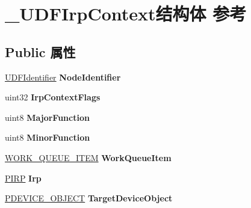 \hypertarget{struct___u_d_f_irp_context}{}\section{\+\_\+\+U\+D\+F\+Irp\+Context结构体 参考}
\label{struct___u_d_f_irp_context}
\subsection*{Public 属性}
\begin{DoxyCompactItemize}
\item 
\mbox{\label{struct___u_d_f_irp_context_a09523e09a44e34a69d63a3c17ddba0e1}} 
\hyperlink{struct___u_d_f_identifier}{U\+D\+F\+Identifier} {\bfseries Node\+Identifier}
\item 
\mbox{\label{struct___u_d_f_irp_context_a2b58d251a05dee0d86924088641f5d07}} 
uint32 {\bfseries Irp\+Context\+Flags}
\item 
\mbox{\label{struct___u_d_f_irp_context_ab63f48afb6cbf0379d5642dcd35232e5}} 
uint8 {\bfseries Major\+Function}
\item 
\mbox{\label{struct___u_d_f_irp_context_a56ee49540c44b9c0c0b18478da3a0050}} 
uint8 {\bfseries Minor\+Function}
\item 
\mbox{\label{struct___u_d_f_irp_context_a4f86c78719b7c6b9692f1de0c75ad493}} 
\hyperlink{struct___w_o_r_k___q_u_e_u_e___i_t_e_m}{W\+O\+R\+K\+\_\+\+Q\+U\+E\+U\+E\+\_\+\+I\+T\+EM} {\bfseries Work\+Queue\+Item}
\item 
\mbox{\label{struct___u_d_f_irp_context_afaa7934722efbed789119b67507d9de4}} 
\hyperlink{interfacevoid}{P\+I\+RP} {\bfseries Irp}
\item 
\mbox{\label{struct___u_d_f_irp_context_ac4f94f9533f08ad2f7a76d0541b910bd}} 
\hyperlink{struct___d_e_v_i_c_e___o_b_j_e_c_t}{P\+D\+E\+V\+I\+C\+E\+\_\+\+O\+B\+J\+E\+CT} {\bfseries Target\+Device\+Object}
\item 
\mbox{\label{struct___u_d_f_irp_context_ace57d42db7c333d5b94ae719ddf48962}} 

\end{DoxyCompactItemize}
